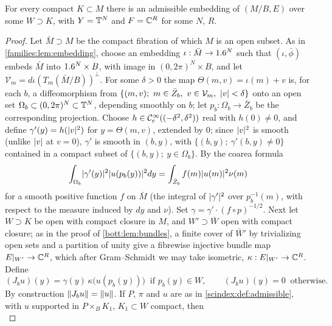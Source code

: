 \begin{lemma}\label{scindex:lem:embedding}
  For every compact $K\subset M$ there is an admissible embedding of $(M/B,E)$
  over some $W\supset K$, with $Y=\mathbb{T}^N$ and $F=\mathbb{C}^R$ for some $N$, $R$.
\end{lemma}
\begin{proof}
  Let $\bar M\supset M$ be the compact fibration of which $M$ is an open
  subset. As in \cref{families:lem:embedding}, choose an embedding $\iota:\bar M\to1.6^N$ such
  that $(\iota,\bar\phi)$ embeds $\bar M$ into $1.6^N\times B$, with image in
  $(0,2\pi)^N\times B$, and let $\mathcal V_m=d\iota(T_m(\bar M/B))^\perp$. For
  some $\delta>0$ the map $\Theta(m,v)=\iota(m)+v$ is, for each $b$, a
  diffeomorphism from $\{(m,v);\ m\in\bar Z_b,\ v\in\mathcal V_m,\ \lvert v\rvert<\delta\}$
  onto an open set $\Omega_b\subset(0,2\pi)^N\subset\mathbb{T}^N$, depending smoothly
  on $b$; let $p_b:\Omega_b\to\bar Z_b$ be the corresponding projection. Choose
  $h\in\mathcal{C}^\infty_{\mathrm{c}}((-\delta^2,\delta^2))$ real with $h(0)\ne0$, and define
  $\gamma'(y)=h(\lvert v\rvert^2)$ for $y=\Theta(m,v)$, extended by $0$; since
  $\lvert v\rvert^2$ is smooth (unlike $\lvert v\rvert$ at $v=0$), $\gamma'$ is smooth in
  $(b,y)$, with $\{(b,y);\ \gamma'(b,y)\ne0\}$ contained in a compact subset of
  $\{(b,y);\ y\in\Omega_b\}$. By the
  coarea formula
  \begin{equation*}
    \int_{\Omega_b}\lvert \gamma'(y)\rvert^2\lvert u(p_b(y))\rvert^2dy=\int_{\bar Z_b}
    f(m)\lvert u(m)\rvert^2\nu(m)
  \end{equation*}
  for a smooth positive function $f$ on $\bar M$ (the integral of
  $\lvert \gamma'\rvert^2$ over $p_b^{-1}(m)$, with respect to the measure induced by
  $dy$ and $\nu$). Set $\gamma=\gamma'\cdot(f\circ p)^{-1/2}$. Next let
  $W\supset K$ be open with compact closure in $M$, and $W'\supset\bar W$ open
  with compact closure; as in the proof of \cref{bott:lem:bundles},
  a finite cover of $\bar W'$ by trivializing open sets and a partition of
  unity give a fibrewise injective bundle map $E|_{W'}\to\mathbb{C}^R$, which after
  Gram--Schmidt we may take isometric, $\kappa:E|_{W'}\to\mathbb{C}^R$. Define
  \begin{equation*}
    (J_bu)(y)=\gamma(y)\,\kappa\bigl(u(p_b(y))\bigr)\ \text{ if }p_b(y)\in W,
    \qquad(J_bu)(y)=0\ \text{ otherwise}.
  \end{equation*}
  By construction $\lVert J_bu\rVert=\lVert u\rVert$. If $P$, $\pi$ and $u$ are as in
  \cref{scindex:def:admissible}, with $u$ supported in $P\times_BK_1$,
  $K_1\subset W$ compact, then
  \begin{equation*}

\end{equation*}
\end{proof}
